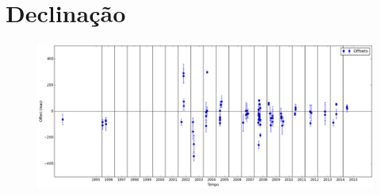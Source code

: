\documentclass[11pt,a4paper]{report}
\begin{document}
\section*{Declinação}

\begin{figure}[h]
\includegraphics[scale=0.35]{Nereida/DEC.png} 
\end{figure}
\end{document}
